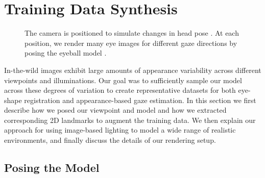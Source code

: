 
\section{Training Data Synthesis}

\begin{figure}
	\captionsetup[subfigure]{labelformat=empty} %
    \captionsetup{subrefformat=parens} %
    \centering
    \begin{subfigure}[t]{0.48\columnwidth}
        \caption{}\label{fig:cam_pos_spher_coords}
    \end{subfigure}
    \hfill
    \begin{subfigure}[t]{0.48\columnwidth}
        \caption{}\label{fig:cam_pos_example_renders}
    \end{subfigure}
    \par\vspace{-28pt}
    \caption{The camera is positioned to simulate changes in head pose . At each position, we render many eye images for different gaze directions by posing the eyeball model .}
    \label{fig:cam_pos}
\end{figure}

In-the-wild images exhibit large amounts of appearance variability across different viewpoints and illuminations.
Our goal was to sufficiently sample our model across these degrees of variation to create representative datasets for both eye-shape registration and appearance-based gaze estimation.
In this section we first describe how we posed our viewpoint and model and how we extracted corresponding 2D landmarks to augment the training data.
We then explain our approach for using image-based lighting \cite{debevec2002image} to model a wide range of realistic environments, and finally discuss the details of our rendering setup.

\subsection{Posing the Model}

